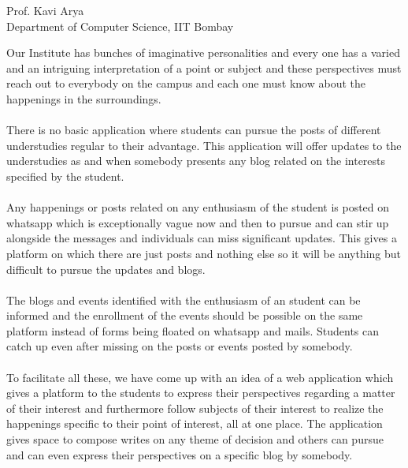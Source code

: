 \documentclass[oneside,a4paper,12pt]{article}
\begin{document}
\bgroup
\def\arraystretch{0.7}
\vspace{35pt}


\begin{center}
{
Prof. Kavi Arya
\\Department of Computer Science, IIT Bombay
}
\end{center}

\newpage
\tableofcontents
\newpage
\newpage
{   \setlength{\parindent}{11mm} }
{ \setlength{\parindent}{0mm} }
Our Institute has bunches of imaginative personalities and every one has a varied and an intriguing interpretation of a point or subject and these perspectives must reach out to everybody on the campus and each one must know about the happenings in the surroundings. 
\\\\There is no basic application where students can pursue the posts of different understudies regular to their advantage. This application will offer updates to the understudies as and when somebody presents any blog related on the interests specified by the student. 
\\\\Any happenings or posts related on any enthusiasm of the student is posted on whatsapp which is exceptionally vague now and then to pursue and can stir up alongside the messages and individuals can miss significant updates. This gives a platform on which there are just posts and nothing else so it will be anything but difficult to pursue the updates and blogs. 
\\\\The blogs and events identified with the enthusiasm of an student can be informed and the enrollment of the events should be possible on the same platform instead of forms being floated on whatsapp and mails. Students can catch up even after missing on the posts or events posted by somebody.
\\\\To facilitate all these, we have come up with an idea of a web application which gives a platform to the students to express their perspectives regarding a matter of their interest and furthermore follow subjects of their interest to realize the happenings specific to their point of interest, all at one place. The application gives space to compose writes on any theme of decision and others can pursue and can even express their perspectives on a specific blog by somebody.
\end{document}
